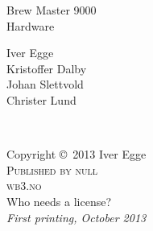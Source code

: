 \documentclass[11pt,fleqn]{book} %
\begin{document}

\begingroup
\thispagestyle{empty}
\centering
\vspace*{9cm}
\par\normalfont\fontsize{35}{35}\sffamily\selectfont
Brew Master 9000\\
Hardware\par %
\vspace*{1cm}
{\Large Iver Egge\\
Kristoffer Dalby\\
Johan Slettvold\\
Christer Lund}\par %
\endgroup


\newpage
~\vfill
\thispagestyle{empty}

\noindent Copyright \copyright\ 2013 Iver Egge\\ %

\noindent \textsc{Published by null}\\ %

\noindent \textsc{wb3.no}\\ %

\noindent Who needs a license?\\ %

\noindent \textit{First printing, October 2013} %



\pagestyle{empty} %

\tableofcontents %

\cleardoublepage %
\end{document}
